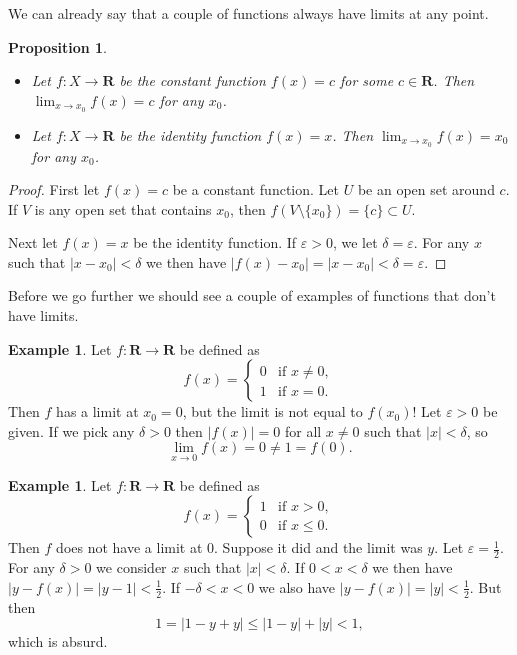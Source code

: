 \documentclass[11pt]{article}
\newtheorem{prop}[theo]{Proposition}
\theoremstyle{definition}
\newtheorem{exam}[theo]{Example}
\def\eps{\varepsilon}
\def\RR{\mathbf{R}}
\begin{document}
We can already say that a couple of functions always have limits at any point.

\begin{prop}
\begin{itemize}
\item
Let $f : X \to \RR$ be the constant function $f(x) = c$ for some $c \in \RR$.
Then $\lim_{x \to x_0} f(x) = c$ for any $x_0$.

\item
Let $f : X \to \RR$ be the identity function $f(x) = x$.
Then $\lim_{x \to x_0} f(x) = x_0$ for any $x_0$.
\end{itemize}
\end{prop}

\begin{proof}
First let $f(x) = c$ be a constant function.
Let $U$ be an open set around $c$.
If $V$ is any open set that contains $x_0$, then $f(V \setminus \{x_0\}) = \{ c
\} \subset U$.

Next let $f(x) = x$ be the identity function.
If $\eps > 0$, we let $\delta = \eps$.
For any $x$ such that $|x - x_0| < \delta$ we then have
$|f(x) - x_0| = |x - x_0| < \delta = \eps$.
\end{proof}


Before we go further we should see a couple of examples of functions that don't
have limits.

\begin{exam}
Let $f : \RR \to \RR$ be defined as
\[
f(x) = \begin{cases}
0 & \text{if $x \not= 0$},
\\
1 & \text{if $x = 0$}.
\end{cases}
\]
Then $f$ has a limit at $x_0 = 0$, but the limit is not equal to $f(x_0)$!
Let $\eps > 0$ be given.
If we pick any $\delta > 0$ then
\(
|f(x)| = 0
\)
for all $x \not= 0$ such that $|x| < \delta$, so 
\[
\lim_{x \to 0} f(x) = 0 \not=1 = f(0).
\]
\end{exam}

\begin{exam}
Let $f : \RR \to \RR$ be defined as
\[
f(x) = \begin{cases}
1 & \text{if $x > 0$},
\\
0 & \text{if $x \leq 0$}.
\end{cases}
\]
Then $f$ does not have a limit at $0$.
Suppose it did and the limit was $y$.
Let $\eps = \frac12$.
For any $\delta > 0$ we consider $x$ such that $|x| < \delta$.
If $0 < x < \delta$ we then have $|y - f(x)| = |y - 1| < \frac12$.
If $-\delta < x < 0$ we also have $|y - f(x)| = |y| < \frac12$.
But then
\[
1
= |1 - y + y|
\leq |1 - y| + |y|
< 1,
\]
which is absurd.
\end{exam}
\end{document}
